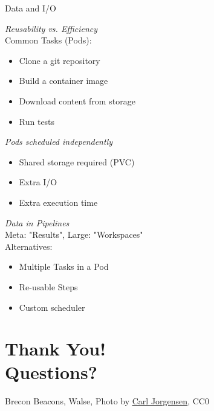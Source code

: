 \documentclass[aspectratio=169,11pt,hyperref={colorlinks=true}]{beamer}
\begin{document}
\begin{3squares}%
  {%
    Data and I/O
  }%
  {%
  \textit{Reusability vs. Efficiency} \\
  \vspace{0.04\paperheight}
  Common Tasks (\faArrowRight Pods):
  \begin{itemize}
    \item Clone a git repository
    \item Build a container image
    \item Download content from storage
    \item Run tests
  \end{itemize}
  }%
  {%
  \textit{Pods scheduled independently} \\
  \begin{itemize}
    \item Shared storage required (PVC)
    \item Extra I/O
    \item Extra execution time
  \end{itemize}
  }%
  {%
  \textit{Data in Pipelines} \\
  \vspace{0.02\paperheight}
  Meta: "Results", Large: "Workspaces" \\
  \vspace{0.01\paperheight}
  Alternatives: \\
  \begin{itemize}
    \item Multiple Tasks in a Pod
    \item Re-usable Steps
    \item Custom scheduler
  \end{itemize}
  }%
\end{3squares}

\section[Q\&A]{Thank You! \\Questions?}

\begin{sectionwithpiclargecentral}{Brecon Beacons, Walse, Photo by \href{https://unsplash.com/@scamartist}{\underline{Carl Jorgensen}}, CC0}
\end{sectionwithpiclargecentral}
\end{document}

